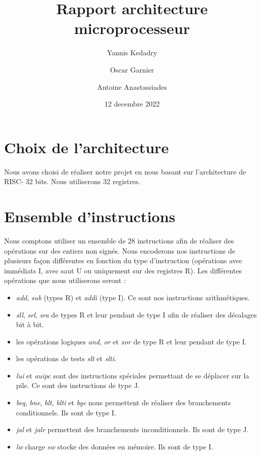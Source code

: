 \documentclass{article}
\title{Rapport architecture microprocesseur}
\author{Yannis Kedadry \and Oscar Garnier \and Antoine Anastassiades }
\date{12 decembre 2022}
\newcommand{\RNum}[1]{\uppercase\expandafter{\romannumeral #1\relax}}
\newcommand{\risc}{RISC-\RNum{5}}
\begin{document}
\maketitle

\section{Choix de l'architecture}
Nous avons choisi de réaliser notre projet en nous basant sur l'architecture de \risc{} 32 bits. Nous utiliserons 32 registres.

\section{Ensemble d'instructions}
Nous comptons utiliser un ensemble de 28 instructions afin de réaliser des opérations sur des entiers non signés. 
Nous encoderons nos instructions de plusieurs façon différentes en fonction du type d'instruction 
(opérations avec immédiats I, avec saut U ou uniquement sur des registres R). 
Les différentes opérations que nous utiliserons seront : 
\begin{itemize}
	\item \emph{add}, \emph{sub} (types R) et \emph{addi} (type I). Ce sont nos instructions arithmétiques.
	\item \emph{sll}, \emph{srl}, \emph{sra} de types R et leur pendant de type I afin de réaliser des décalages bit à bit.
	\item les opérations logiques \emph{and}, \emph{or} et \emph{xor} de type R et leur pendant de type I.
	\item les opérations de tests \emph{slt} et \emph{slti}.
	\item \emph{lui} et \emph{auipc} sont des instructions spéciales permettant de se déplacer sur la pile. Ce sont des instructions de type J.
	\item \emph{beq}, \emph{bne}, \emph{blt}, \emph{blti} et \emph{bge} nous permettent de réaliser des branchements conditionnels. Ils sont de type I.
	\item \emph{jal} et \emph{jalr} permettent des branchements inconditionnels. Ils sont de type J.
	\item \emph{lw} charge \emph{sw} stocke des données en mémoire. Ils sont de type I.
\end{itemize}
\end{document}
